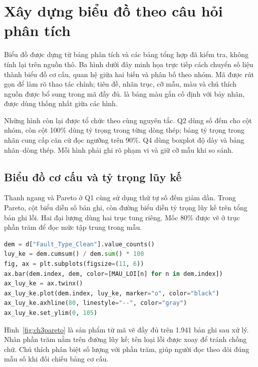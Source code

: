 \section{Xây dựng biểu đồ theo câu hỏi phân tích}

Biểu đồ được dựng từ bảng phân tích và các bảng tổng hợp đã kiểm tra, không tính lại trên nguồn thô. Ba hình dưới đây minh họa trực tiếp cách chuyển số liệu thành biểu đồ cơ cấu, quan hệ giữa hai biến và phân bố theo nhóm. Mã được rút gọn để làm rõ thao tác chính; tiêu đề, nhãn trục, cỡ mẫu, màu và chú thích nguồn được bổ sung trong mã đầy đủ.  là bảng màu gắn cố định với bảy nhãn, được dùng thống nhất giữa các hình.

Những hình còn lại được tổ chức theo cùng nguyên tắc. Q2 dùng số đếm cho cột nhóm, còn cột 100\% dùng tỷ trọng trong từng dòng thép; bảng tỷ trọng trong nhãn cung cấp căn cứ đọc ngưỡng trên 90\%. Q4 dùng boxplot độ dày và bảng nhãn--dòng thép. Mỗi hình phải ghi rõ phạm vi và giữ cỡ mẫu khi so sánh.

\subsection{Biểu đồ cơ cấu và tỷ trọng lũy kế}

Thanh ngang và Pareto ở Q1 cùng sử dụng thứ tự số đếm giảm dần. Trong Pareto, cột biểu diễn số bản ghi, còn đường biểu diễn tỷ trọng lũy kế trên tổng bản ghi lỗi. Hai đại lượng dùng hai trục tung riêng. Mốc 80\% được vẽ ở trục phần trăm để đọc mức tập trung trong mẫu.

\noindent\begin{minipage}{\linewidth}
\begin{lstlisting}[language=Python]
dem = d["Fault_Type_Clean"].value_counts()
luy_ke = dem.cumsum() / dem.sum() * 100
fig, ax = plt.subplots(figsize=(11, 6))
ax.bar(dem.index, dem, color=[MAU_LOI[n] for n in dem.index])
ax_luy_ke = ax.twinx()
ax_luy_ke.plot(dem.index, luy_ke, marker="o", color="black")
ax_luy_ke.axhline(80, linestyle="--", color="gray")
ax_luy_ke.set_ylim(0, 105)
\end{lstlisting}
\end{minipage}\par

Hình~\ref{fig:ch3pareto} là sản phẩm từ mã vẽ đầy đủ trên 1.941 bản ghi sau xử lý. Nhãn phần trăm nằm trên đường lũy kế; tên loại lỗi được xoay để tránh chồng chữ. Chú thích phân biệt số lượng với phần trăm, giúp người đọc theo dõi đúng mẫu số khi đối chiếu bảng cơ cấu.

